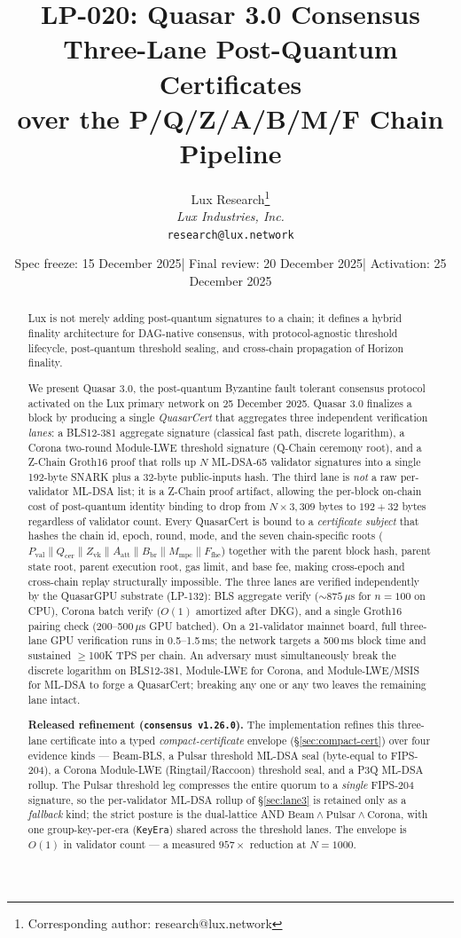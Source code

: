 \documentclass[11pt,a4paper]{article}
\title{LP-020: Quasar 3.0 Consensus\\[4pt]
\large Three-Lane Post-Quantum Certificates\\
over the P/Q/Z/A/B/M/F Chain Pipeline}
\author{
Lux Research\thanks{Corresponding author: research@lux.network}\\
\textit{Lux Industries, Inc.}\\
\texttt{research@lux.network}
}
\date{Spec freeze: 15 December 2025\quad|\quad
Final review: 20 December 2025\quad|\quad
Activation: 25 December 2025}
\begin{document}
\luxcoverpage

\begin{abstract}
\noindent Lux is not merely adding post-quantum signatures to a chain; it defines a hybrid finality architecture for DAG-native consensus, with protocol-agnostic threshold lifecycle, post-quantum threshold sealing, and cross-chain propagation of Horizon finality.

We present Quasar 3.0, the post-quantum Byzantine fault tolerant consensus
protocol activated on the Lux primary network on 25 December 2025. Quasar 3.0
finalizes a block by producing a single \emph{QuasarCert} that aggregates
three independent verification \emph{lanes}: a BLS12-381 aggregate signature
(classical fast path, discrete logarithm), a Corona two-round Module-LWE
threshold signature (Q-Chain ceremony root), and a Z-Chain Groth16 proof that
rolls up $N$ ML-DSA-65 validator signatures into a single 192-byte SNARK plus
a 32-byte public-inputs hash. The third lane is \emph{not} a raw per-validator
ML-DSA list; it is a Z-Chain proof artifact, allowing the per-block on-chain
cost of post-quantum identity binding to drop from $N \times 3{,}309$ bytes
to $192 + 32$ bytes regardless of validator count. Every QuasarCert is bound
to a \emph{certificate subject} that hashes the chain id, epoch, round, mode,
and the seven chain-specific roots
($P_\text{val} \mathbin\| Q_\text{cer} \mathbin\| Z_\text{vk} \mathbin\|
A_\text{att} \mathbin\| B_\text{br} \mathbin\| M_\text{mpc} \mathbin\|
F_\text{fhe}$) together with the parent block hash, parent state root,
parent execution root, gas limit, and base fee, making cross-epoch and
cross-chain replay structurally impossible. The three lanes are verified
independently by the QuasarGPU substrate (LP-132): BLS aggregate verify
(${\sim}875\,\mu$s for $n{=}100$ on CPU), Corona batch verify ($O(1)$
amortized after DKG), and a single Groth16 pairing check (200--500\,$\mu$s
GPU batched). On a 21-validator mainnet board, full three-lane GPU
verification runs in 0.5--1.5\,ms; the network targets a 500\,ms block time
and sustained $\geq$100K TPS per chain. An adversary must simultaneously
break the discrete logarithm on BLS12-381, Module-LWE for Corona, and
Module-LWE/MSIS for ML-DSA to forge a QuasarCert; breaking any one or any
two leaves the remaining lane intact.

\textbf{Released refinement (\texttt{consensus v1.26.0}).} The
implementation refines this three-lane certificate into a typed
\emph{compact-certificate} envelope (\S\ref{sec:compact-cert}) over four
evidence kinds --- Beam-BLS, a Pulsar threshold ML-DSA seal (byte-equal to
FIPS-204), a Corona Module-LWE (Ringtail/Raccoon) threshold seal, and a P3Q
ML-DSA rollup. The
Pulsar threshold leg compresses the entire quorum to a \emph{single}
FIPS-204 signature, so the per-validator ML-DSA rollup of \S\ref{sec:lane3}
is retained only as a \emph{fallback} kind; the strict posture is the
dual-lattice AND $\mathrm{Beam} \wedge \mathrm{Pulsar} \wedge \mathrm{Corona}$,
with one group-key-per-era (\texttt{KeyEra}) shared across the threshold
lanes. The envelope is $O(1)$ in validator count --- a measured $957\times$
reduction at $N{=}1000$.
\end{abstract}
\end{document}
